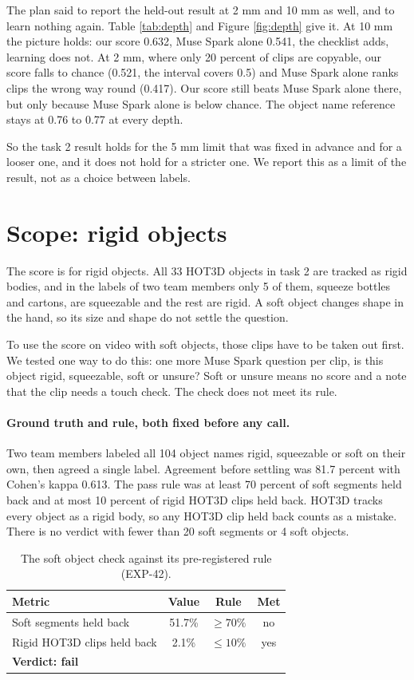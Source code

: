 \documentclass[10pt,twocolumn,letterpaper]{article}
\begin{document}
The plan said to report the held-out result at 2 mm and 10 mm as well, and to
learn nothing again. Table \ref{tab:depth} and Figure \ref{fig:depth} give it.
At 10 mm the picture holds: our score 0.632, Muse Spark alone 0.541, the
checklist adds, learning does not. At 2 mm, where only 20 percent of clips are
copyable, our score falls to chance (0.521, the interval covers 0.5) and Muse
Spark alone ranks clips the wrong way round (0.417). Our score still beats Muse
Spark alone there, but only because Muse Spark alone is below chance. The
object name reference stays at 0.76 to 0.77 at every depth.

So the task 2 result holds for the 5 mm limit that was fixed in advance and for
a looser one, and it does not hold for a stricter one. We report this as a
limit of the result, not as a choice between labels.

\section{Scope: rigid objects}
\label{sec:soft}

The score is for rigid objects. All 33 HOT3D objects in task 2 are tracked as
rigid bodies, and in the labels of two team members only 5 of them, squeeze
bottles and cartons, are squeezable and the rest are rigid. A soft object
changes shape in the hand, so its size and shape do not settle the question.

To use the score on video with soft objects, those clips have to be taken out
first. We tested one way to do this: one more Muse Spark question per clip, is
this object rigid, squeezable, soft or unsure? Soft or unsure means no score
and a note that the clip needs a touch check. The check does not meet its
rule.

\paragraph{Ground truth and rule, both fixed before any call.} Two team members
labeled all 104 object names rigid, squeezable or soft on their own, then
agreed a single label. Agreement before settling was 81.7 percent with Cohen's
kappa 0.613. The pass rule was at least 70 percent of soft segments held back
and at most 10 percent of rigid HOT3D clips held back. HOT3D tracks every
object as a rigid body, so any HOT3D clip held back counts as a mistake. There
is no verdict with fewer than 20 soft segments or 4 soft objects.

\begin{table}[t]
\centering
\caption{The soft object check against its pre-registered rule (EXP-42).}
\label{tab:soft}
\small
\begin{tabular}{lccc}
\toprule
Metric & Value & Rule & Met \\
\midrule
Soft segments held back & 51.7\% & $\ge 70\%$ & no \\
Rigid HOT3D clips held back & 2.1\% & $\le 10\%$ & yes \\
\midrule
\multicolumn{4}{l}{\textbf{Verdict: fail}} \\
\bottomrule
\end{tabular}
\end{table}
\end{document}
